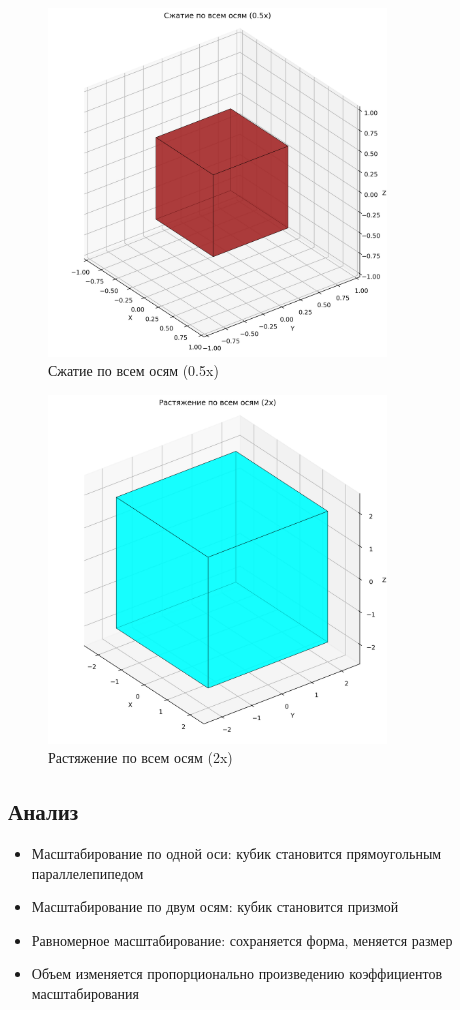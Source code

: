 \begin{figure}[H]
\centering
\includegraphics[width=0.8\textwidth]{images/task2/scale_all_small.png}
\caption{Сжатие по всем осям (0.5x)}
\end{figure}

\begin{figure}[H]
\centering
\includegraphics[width=0.8\textwidth]{images/task2/scale_all_large.png}
\caption{Растяжение по всем осям (2x)}
\end{figure}

\subsection*{Анализ}
\begin{itemize}
    \item Масштабирование по одной оси: кубик становится прямоугольным параллелепипедом
    \item Масштабирование по двум осям: кубик становится призмой
    \item Равномерное масштабирование: сохраняется форма, меняется размер
    \item Объем изменяется пропорционально произведению коэффициентов масштабирования
\end{itemize}


